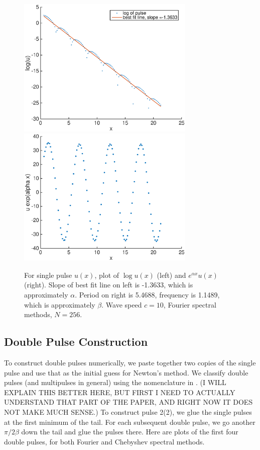 \documentclass[12pt]{article}
\begin{document}
\begin{figure}[H]
	\includegraphics[width=8.5cm]{decaysinglepulse.eps}
	\includegraphics[width=8.5cm]{oscsinglepulse.eps}
	\caption{For single pulse $u(x)$, plot of $\log u(x)$ (left) and $e^{\alpha x} u(x)$ (right). Slope of best fit line on left is -1.3633, which is approximately $\alpha$. Period on right is 5.4688, frequency is 1.1489, which is approximately $\beta$. Wave speed $c = 10$, Fourier spectral methods, $N = 256$.}
\end{figure}

\subsection{Double Pulse Construction}

To construct double pulses numerically, we paste together two copies of the single pulse and use that as the initial guess for Newton's method. We classify double pulses (and multipulses in general) using the nomenclature in \cite{Champneys1993}. (I WILL EXPLAIN THIS BETTER HERE, BUT FIRST I NEED TO ACTUALLY UNDERSTAND THAT PART OF THE PAPER, AND RIGHT NOW IT DOES NOT MAKE MUCH SENSE.) To construct pulse 2(2), we glue the single pulses at the first minimum of the tail. For each subsequent double pulse, we go another $\pi / 2 \beta$ down the tail and glue the pulses there. Here are plots of the first four double pulses, for both Fourier and Chebyshev spectral methods.
\end{document}
